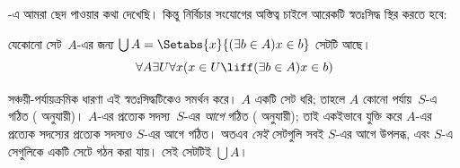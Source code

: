\documentclass[../../../include/open-logic-section]{subfiles}
\begin{document}

-এ আমরা
ছেদ পাওয়ার কথা দেখেছি। কিন্তু নির্বিচার সংযোগের
অস্তিত্ব চাইলে আরেকটি স্বতঃসিদ্ধ স্থির করতে হবে:

\begin{axiom}[সংযোগ] যেকোনো সেট~$A$-এর জন্য
$\bigcup A = \Setabs{x}{(\exists b \in A) x \in b}$
সেটটি আছে।
\[
  \forall A \exists U \forall x(x \in U \liff (\exists b \in A)x \in b)
\]
\end{axiom}

সঞ্চয়ী-পর্যায়ক্রমিক ধারণা এই স্বতঃসিদ্ধটিকেও
সমর্থন করে। $A$ একটি সেট ধরি; তাহলে $A$ কোনো
পর্যায়~$S$-এ গঠিত (\stageshier{} অনুযায়ী)।
$A$-এর প্রত্যেক সদস্য~$S$-এর \emph{আগে} গঠিত
(\stagesacc{} অনুযায়ী); তাই একইভাবে যুক্তি করে
$A$-এর প্রত্যেক সদস্যের প্রত্যেক সদস্যও $S$-এর
আগে গঠিত। অতএব \emph{সেই} সেটগুলি সবই $S$-এর
আগে উপলব্ধ, এবং $S$-এ সেগুলিকে একটি সেটে
গঠন করা যায়। সেই সেটটিই $\bigcup A$।
\end{document}
